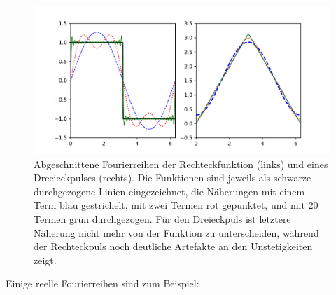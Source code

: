 \begin{figure}
  \centering
  \includegraphics[width=\textwidth]{plots/fourier}
  \caption{Abgeschnittene Fourierreihen der Rechteckfunktion (links)
    und eines Dreeieckpulses (rechts). Die Funktionen sind jeweils als
    schwarze durchgezogene Linien eingezeichnet, die Näherungen mit
    einem Term blau gestrichelt, mit zwei Termen rot gepunktet, und
    mit 20 Termen grün durchgezogen. Für den Dreieckpuls ist letztere
    Näherung nicht mehr von der Funktion zu unterscheiden, während der
    Rechteckpuls noch deutliche Artefakte an den Unstetigkeiten zeigt.}
  \label{fig:fourier}
\end{figure}
Einige reelle Fourierreihen sind zum Beispiel:
